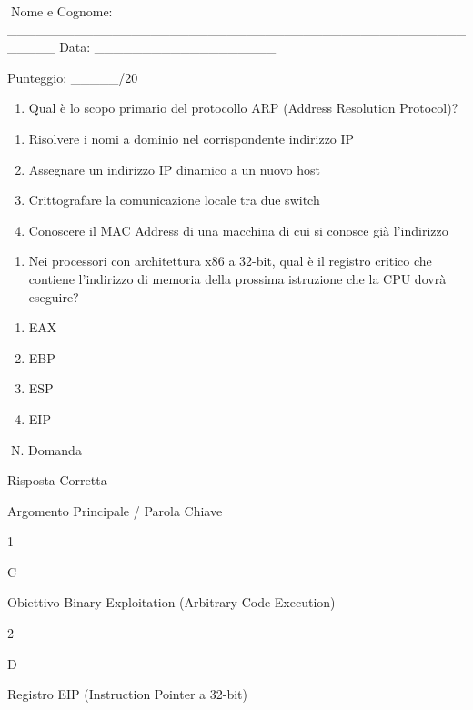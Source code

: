 \documentclass[11pt,a4paper]{article}
\providecommand{\tightlist}{%
  \setlength{\itemsep}{0pt}\setlength{\parskip}{0pt}}
\begin{document}
Nome e Cognome:
\_\_\_\_\_\_\_\_\_\_\_\_\_\_\_\_\_\_\_\_\_\_\_\_\_\_\_\_\_\_\_\_\_\_\_\_\_\_\_\_\_\_\_\_\_\_\_\_\_\_\_\_\_
Data: \_\_\_\_\_\_\_\_\_\_\_\_\_\_\_\_\_\_\_

Punteggio: \_\_\_\_\_/20

\begin{enumerate}
\def\labelenumi{\arabic{enumi}.}
\setcounter{enumi}{18}
\tightlist
\item
  Qual è lo scopo primario del protocollo ARP (Address Resolution
  Protocol)?
\end{enumerate}

\begin{enumerate}
\def\labelenumi{\Alph{enumi})}
\tightlist
\item
  Risolvere i nomi a dominio nel corrispondente indirizzo IP
\item
  Assegnare un indirizzo IP dinamico a un nuovo host
\item
  Crittografare la comunicazione locale tra due switch
\item
  Conoscere il MAC Address di una macchina di cui si conosce già
  l'indirizzo
\end{enumerate}

\begin{enumerate}
\def\labelenumi{\arabic{enumi}.}
\setcounter{enumi}{19}
\tightlist
\item
  Nei processori con architettura x86 a 32-bit, qual è il registro
  critico che contiene l'indirizzo di memoria della prossima istruzione
  che la CPU dovrà eseguire?
\end{enumerate}

\begin{enumerate}
\def\labelenumi{\Alph{enumi})}
\tightlist
\item
  EAX
\item
  EBP
\item
  ESP
\item
  EIP
\end{enumerate}

N. Domanda

Risposta Corretta

Argomento Principale / Parola Chiave

1

C

Obiettivo Binary Exploitation (Arbitrary Code Execution)

2

D

Registro EIP (Instruction Pointer a 32-bit)
\end{document}
